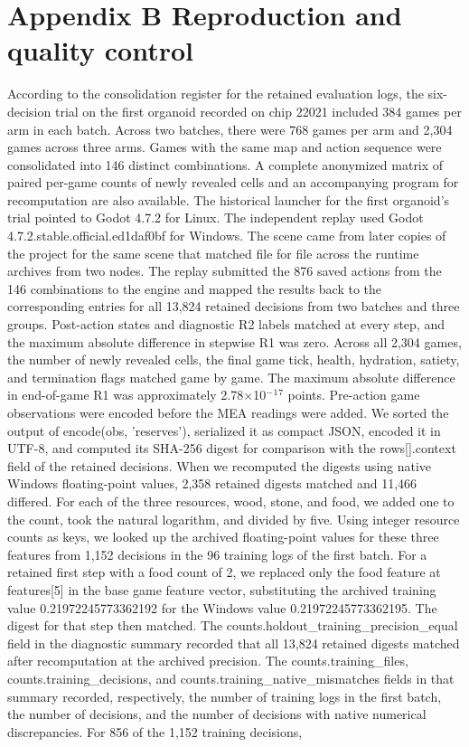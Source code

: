 \documentclass{article}
\begin{document}
\section*{Appendix B Reproduction and quality control}


According to the consolidation register for the retained evaluation logs, the six-decision trial on the first organoid recorded on chip 22021 included 384 games per arm in each batch. Across two batches, there were 768 games per arm and 2,304 games across three arms. Games with the same map and action sequence were consolidated into 146 distinct combinations. A complete anonymized matrix of paired per-game counts of newly revealed cells and an accompanying program for recomputation are also available. The historical launcher for the first organoid’s trial pointed to Godot 4.7.2 for Linux. The independent replay used Godot 4.7.2.stable.official.ed1daf0bf for Windows. The scene came from later copies of the project for the same scene that matched file for file across the runtime archives from two nodes. The replay submitted the 876 saved actions from the 146 combinations to the engine and mapped the results back to the corresponding entries for all 13,824 retained decisions from two batches and three groups. Post-action states and diagnostic R2 labels matched at every step, and the maximum absolute difference in stepwise R1 was zero. Across all 2,304 games, the number of newly revealed cells, the final game tick, health, hydration, satiety, and termination flags matched game by game. The maximum absolute difference in end-of-game R1 was approximately 2.78\ensuremath{\times}10\ensuremath{{}^{-}}\ensuremath{{}^{1}}\ensuremath{{}^{7}} points. Pre-action game observations were encoded before the MEA readings were added. We sorted the output of encode(obs, 'reserves'), serialized it as compact JSON, encoded it in UTF-8, and computed its SHA-256 digest for comparison with the rows[].context field of the retained decisions. When we recomputed the digests using native Windows floating-point values, 2,358 retained digests matched and 11,466 differed. For each of the three resources, wood, stone, and food, we added one to the count, took the natural logarithm, and divided by five. Using integer resource counts as keys, we looked up the archived floating-point values for these three features from 1,152 decisions in the 96 training logs of the first batch. For a retained first step with a food count of 2, we replaced only the food feature at features[5] in the base game feature vector, substituting the archived training value 0.21972245773362192 for the Windows value 0.21972245773362195. The digest for that step then matched. The counts.holdout\_\allowbreak{}training\_\allowbreak{}precision\_\allowbreak{}equal field in the diagnostic summary recorded that all 13,824 retained digests matched after recomputation at the archived precision. The counts.training\_\allowbreak{}files, counts.training\_\allowbreak{}decisions, and counts.training\_\allowbreak{}native\_\allowbreak{}mismatches fields in that summary recorded, respectively, the number of training logs in the first batch, the number of decisions, and the number of decisions with native numerical discrepancies. For 856 of the 1,152 training decisions, 
\end{document}
